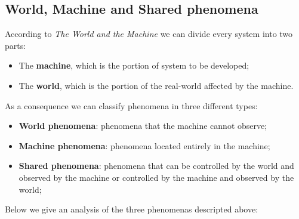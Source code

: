 \documentclass[a4paper, hidelinks, 12pt]{report}
\begin{document}
	\subsection{World, Machine and Shared phenomena}\label{subsec:world,-machine-and-shared-phenomena}
	According to \textit{The World and the Machine} we can divide every system into two parts:
	\begin{itemize}
		\item The \textbf{machine}, which is the portion of system to be developed;
		\item The \textbf{world}, which is the portion of the real-world affected by the machine.
	\end{itemize}
	As a consequence we can classify phenomena in three different types:
	\begin{itemize}
		\item \textbf{World phenomena}: phenomena that the machine cannot observe;
		\item \textbf{Machine phenomena}: phenomena located entirely in the machine;
		\item \textbf{Shared phenomena}: phenomena that can be controlled by the world and observed by the machine or controlled by the machine and observed by the world;
	\end{itemize}
	Below we give an analysis of the three phenomenas descripted above:
\end{document}
